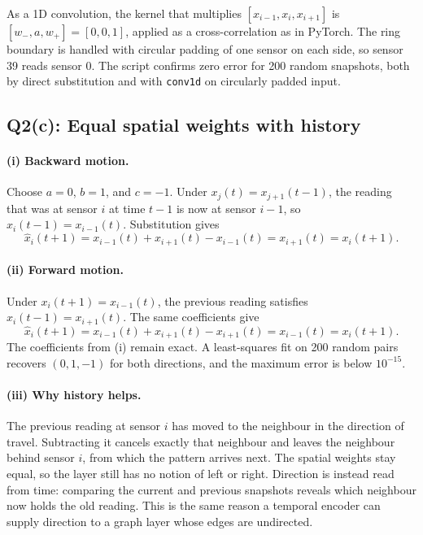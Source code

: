 \documentclass{article}
\begin{document}
As a 1D convolution, the kernel that multiplies $[x_{i-1},x_i,x_{i+1}]$ is $[w_-,a,w_+]=[0,0,1]$, applied as a cross-correlation as in PyTorch. The ring boundary is handled with circular padding of one sensor on each side, so sensor 39 reads sensor 0. The script confirms zero error for 200 random snapshots, both by direct substitution and with \texttt{conv1d} on circularly padded input.

\subsection*{Q2(c): Equal spatial weights with history}

\paragraph{(i) Backward motion.}
Choose $a=0$, $b=1$, and $c=-1$. Under $x_j(t)=x_{j+1}(t-1)$, the reading that was at sensor $i$ at time $t-1$ is now at sensor $i-1$, so $x_i(t-1)=x_{i-1}(t)$. Substitution gives
\begin{equation}
  \hat x_i(t+1)=x_{i-1}(t)+x_{i+1}(t)-x_{i-1}(t)=x_{i+1}(t)=x_i(t+1).
\end{equation}

\paragraph{(ii) Forward motion.}
Under $x_i(t+1)=x_{i-1}(t)$, the previous reading satisfies $x_i(t-1)=x_{i+1}(t)$. The same coefficients give
\begin{equation}
  \hat x_i(t+1)=x_{i-1}(t)+x_{i+1}(t)-x_{i+1}(t)=x_{i-1}(t)=x_i(t+1).
\end{equation}
The coefficients from (i) remain exact. A least-squares fit on 200 random pairs recovers $(0,1,-1)$ for both directions, and the maximum error is below $10^{-15}$.

\paragraph{(iii) Why history helps.}
The previous reading at sensor $i$ has moved to the neighbour in the direction of travel. Subtracting it cancels exactly that neighbour and leaves the neighbour behind sensor $i$, from which the pattern arrives next. The spatial weights stay equal, so the layer still has no notion of left or right. Direction is instead read from time: comparing the current and previous snapshots reveals which neighbour now holds the old reading. This is the same reason a temporal encoder can supply direction to a graph layer whose edges are undirected.
\end{document}
